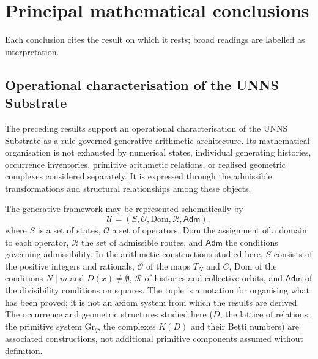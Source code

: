 \section{Principal mathematical conclusions}\label{sec:conclusions}
Each conclusion cites the result on which it rests; broad readings are labelled as interpretation.
\subsection{Operational characterisation of the UNNS Substrate}\label{sec:characterisation}
The preceding results support an operational characterisation of the UNNS Substrate as a rule-governed generative arithmetic architecture. Its mathematical organisation is not exhausted by numerical states, individual generating histories, occurrence inventories, primitive arithmetic relations, or realised geometric complexes considered separately. It is expressed through the admissible transformations and structural relationships among these objects.

The generative framework may be represented schematically by
\[
\mathcal U=(S,\mathcal O,\mathrm{Dom},\mathcal R,\mathsf{Adm}),
\]
where $S$ is a set of states, $\mathcal O$ a set of operators, $\mathrm{Dom}$ the assignment of a domain to each operator, $\mathcal R$ the set of admissible routes, and $\mathsf{Adm}$ the conditions governing admissibility. In the arithmetic constructions studied here, $S$ consists of the positive integers and rationals, $\mathcal O$ of the maps $T_N$ and $C$, $\mathrm{Dom}$ of the conditions $N\mid m$ and $D(x)\neq\emptyset$, $\mathcal R$ of histories and collective orbits, and $\mathsf{Adm}$ of the divisibility conditions on squares. The tuple is a notation for organising what has been proved; it is not an axiom system from which the results are derived. The occurrence and geometric structures studied here ($D$, the lattice of relations, the primitive system $\mathrm{Gr}_q$, the complexes $K(D)$ and their Betti numbers) are associated constructions, not additional primitive components assumed without definition.

